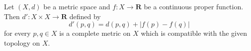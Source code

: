 Let $(X, d)$ be a metric space and $f: X \to \mathbf{R}$ be a continuous proper function. Then $d': X \times X \to \mathbf{R}$ defined by
$$
d'(p, q) = d(p, q) + |f(p) - f(q)|
$$
for every $p, q \in X$ is a complete metric on $X$ which is compatible with the given topology on $X$.
